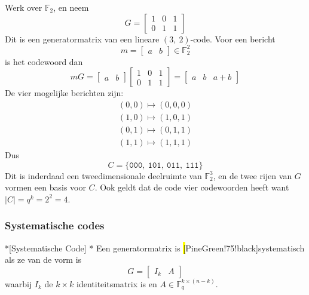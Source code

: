 \textbf{} Werk over $\mathbb{F}_2$, en neem
\begin{equation*}
    G = \begin{bmatrix}
        1 & 0 & 1 \\
        0 & 1 & 1
    \end{bmatrix}
\end{equation*}
Dit is een generatormatrix van een lineare $(3,\ 2)$-code. Voor een bericht
\begin{equation*}
    m = \begin{bmatrix}
        a & b
    \end{bmatrix} \in \mathbb{F}_2^2
\end{equation*}
is het codewoord dan
\begin{equation*}
    mG = \begin{bmatrix}
        a & b
    \end{bmatrix}\begin{bmatrix}
        1 & 0 & 1 \\
        0 & 1 & 1
    \end{bmatrix} = \begin{bmatrix}
        a & b & a + b
    \end{bmatrix}
\end{equation*}
De vier mogelijke berichten zijn:
\begin{equation*}
    \begin{gathered}
        (0, 0) \mapsto (0,0,0) \\
        (1, 0) \mapsto (1,0,1) \\
        (0, 1) \mapsto (0,1,1) \\
        (1, 1) \mapsto (1,1,1) 
    \end{gathered}
\end{equation*}
Dus
\begin{equation*}
    C = \{\mathtt{000},\ \mathtt{101},\ \mathtt{011},\ \mathtt{111}\}
\end{equation*}
Dit is inderdaad een tweedimensionale deelruimte van $\mathbb{F}_2^3$, en de twee rijen van $G$ vormen een basis voor $C$. Ook geldt dat de code vier codewoorden heeft want $|C| = q^k = 2^2 = 4$.

\subsubsection{Systematische codes}

\begin{nicedefinition}*[Systematische Code]
    \nextpart[]*
    Een generatormatrix is \hl[PineGreen!75!black]{systematisch} als ze van de vorm is
    \begin{equation*}
        G = \begin{bmatrix}
            I_k & A
        \end{bmatrix}
    \end{equation*}
    waarbij $I_k$ de $k \times k$ identiteitsmatrix is en $A \in \mathbb{F}_q^{k \times (n-k)}$.
\end{nicedefinition}

